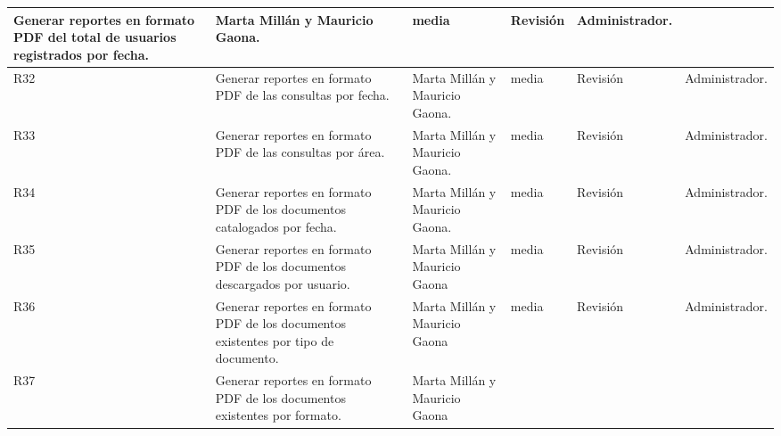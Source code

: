 \begin{center}
\begin{longtable}{|p{0.5cm}|p{3cm}|p{2cm}|p{0.8cm}|p{1.5cm}|p{2cm}|}
Generar reportes en formato PDF del total de usuarios registrados por fecha.
&	

Marta Millán y Mauricio Gaona.
&	

media
&	

Revisión
&	

Administrador.\\
\hline
R32
	&

Generar reportes en formato PDF de las consultas por fecha.
	&

Marta Millán y Mauricio Gaona.
	&

media
	&

Revisión
	&

Administrador.\\
\hline
R33
	&

Generar reportes en formato PDF de las consultas por área.
	&

Marta Millán y Mauricio Gaona.
	&

media
	&

Revisión
	&

Administrador.\\
\hline
R34
	&

Generar reportes en formato PDF de los documentos catalogados por fecha.
	&

Marta Millán y Mauricio Gaona.
	&

media
	&

Revisión
	&

Administrador.\\
\hline
R35
	&

Generar reportes en formato PDF de los documentos descargados por usuario.
	&

Marta Millán y Mauricio Gaona
	&

media
	&

Revisión
	&

Administrador.\\
\hline
R36
	
&
Generar reportes en formato PDF de los documentos existentes por tipo de documento.
&	

Marta Millán y Mauricio Gaona
&	

media
&	

Revisión
&	

Administrador.\\
\hline
R37
	&

Generar reportes en formato PDF de los documentos existentes por formato.
	&

Marta Millán y Mauricio Gaona
	&


\end{longtable}
\end{center}
